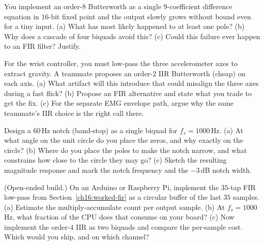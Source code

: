 \begin{exercise}
You implement an order-$8$ Butterworth as a single $9$-coefficient difference
equation in $16$-bit fixed point and the output slowly grows without bound even
for a tiny input. (a) What has most likely happened to at least one pole? (b) Why
does a cascade of four biquads avoid this? (c) Could this failure ever happen to
an FIR filter? Justify.
\end{exercise}

\begin{exercise}
For the wrist controller, you must low-pass the three accelerometer axes to extract
gravity. A teammate proposes an order-$2$ IIR Butterworth (cheap) on each axis.
(a) What artifact will this introduce that could misalign the three axes during a
fast flick? (b) Propose an FIR alternative and state what you trade to get the fix.
(c) For the separate EMG envelope path, argue why the same teammate's IIR choice is
the right call there.
\end{exercise}

\begin{exercise}
Design a $60$\,Hz notch (band-stop) as a single biquad for $f_s = 1000$\,Hz.
(a) At what angle on the unit circle do you place the zeros, and why exactly on the
circle? (b) Where do you place the poles to make the notch narrow, and what
constrains how close to the circle they may go? (c) Sketch the resulting magnitude
response and mark the notch frequency and the $-3$\,dB notch width.
\end{exercise}

\begin{exercise}
(Open-ended build.) On an Arduino or Raspberry Pi, implement the $35$-tap FIR
low-pass from Section~\ref{ch16:worked-fir} as a circular buffer of the last $35$
samples. (a) Estimate the multiply-accumulate count per output sample. (b) At
$f_s = 1000$\,Hz, what fraction of the CPU does that consume on your board?
(c) Now implement the order-$4$ IIR as two biquads and compare the per-sample
cost. Which would you ship, and on which channel?
\end{exercise}

